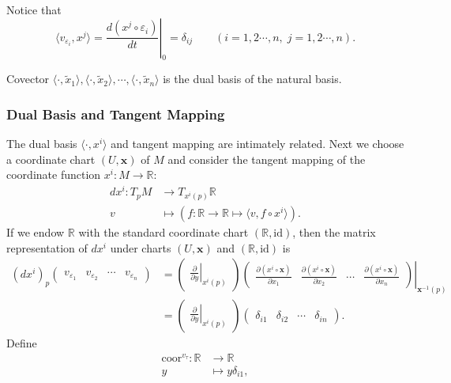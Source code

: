 \documentclass{report}
\begin{document}
Notice that
\[
    \langle v_{\varepsilon_i}, x^j\rangle=\left.\frac{d( x^j\circ\varepsilon_i)}{dt}\right|_0=\delta_{ij}\qquad(i=1,2\cdots,n,\;j=1,2\cdots,n).
\]

Covector $\langle\cdot,\tilde{x}_1\rangle,\langle\cdot,\tilde{x}_2\rangle,\cdots,\langle\cdot,\tilde{x}_n\rangle$ is the dual basis of the natural basis.

\subsubsection{Dual Basis and Tangent Mapping}
The dual basis $\langle\cdot,{x}^i\rangle$ and tangent mapping are intimately related. 
Next we choose a coordinate chart $(U,\mathbf{x})$ of $M$ and consider the tangent mapping of the coordinate function ${x}^i: M\to \mathbb{R}$:
\[
    \begin{aligned}
        d{x}^i:T_pM&\longrightarrow T_{{x}^i(p)}\mathbb{R}\\
        v&\longmapsto \left(f:\mathbb{R}\to \mathbb{R} \longmapsto\langle v,f\circ {x}^i\rangle\right).
    \end{aligned}
\]
If we endow $\mathbb{R}$ with the standard coordinate chart $(\mathbb{R},\mathrm{id})$, then the matrix representation of $d{x}^i$ under charts $(U,\mathbf{x})$ and $(\mathbb{R},\mathrm{id})$ is
\[
    \begin{aligned}
    (d{x}^i)_p
    \begin{pmatrix}
    v_{\varepsilon_1}&v_{\varepsilon_2}&\cdots&v_{\varepsilon_n}
    \end{pmatrix}
    &=
    \begin{pmatrix}
        \left.\frac{\partial}{\partial y}\right|_{{x}^i(p)}
    \end{pmatrix}
    \left.\begin{pmatrix}
        \frac{\partial({x}^i\circ\mathbf{x})}{\partial
x_1}&\frac{\partial({x}^i\circ\mathbf{x})}{\partial
x_2}&\cdots&\frac{\partial({x}^i\circ\mathbf{x})}{\partial x_n}
    \end{pmatrix}\right|_{\mathbf{x}^{-1}(p)}\\
    &=\begin{pmatrix}
        \left.\frac{\partial}{\partial y}\right|_{{x}^i(p)}
    \end{pmatrix}
    \begin{pmatrix}
        \delta_{i1} &\delta_{i2}&\cdots&\delta_{in}
    \end{pmatrix}.
    \end{aligned}
    \]
Define
\[
    \begin{aligned}
        \mathrm{coor}^{v_{\tau}}:\mathbb{R}&\longrightarrow\mathbb{R}\\
        y&\longmapsto y\delta_{i1},
    \end{aligned}
\]
\end{document}
